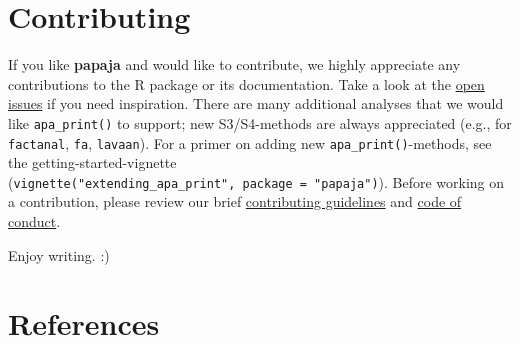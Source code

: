 \documentclass[
  ,man,floatsintext]{apa6}
\begin{document}
\hypertarget{contributing}{%
\section{Contributing}\label{contributing}}

If you like \textbf{papaja} and would like to contribute, we highly appreciate any contributions to the R package or its documentation.
Take a look at the \href{https://github.com/crsh/papaja/issues}{open issues} if you need inspiration.
There are many additional analyses that we would like \texttt{apa\_print()} to support; new S3/S4-methods are always appreciated (e.g., for \texttt{factanal}, \texttt{fa}, \texttt{lavaan}).
For a primer on adding new \texttt{apa\_print()}-methods, see the getting-started-vignette (\texttt{vignette("extending\_apa\_print",\ package\ =\ "papaja")}).
Before working on a contribution, please review our brief \href{https://github.com/crsh/papaja/blob/master/.github/CONTRIBUTING.md}{contributing guidelines} and \href{https://github.com/crsh/papaja/blob/master/CODE_OF_CONDUCT.md}{code of conduct}.

Enjoy writing.
:)

\pagebreak

\hypertarget{references}{%
\section{References}\label{references}}

\setlength{\parindent}{-0.5in}
\setlength{\leftskip}{0.5in}
\end{document}
